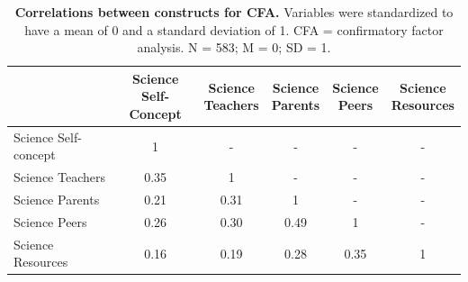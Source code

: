 \begin{table}[ht]
\begin{tabular}{lccccc}
\cline{2-6}
                  & \parbox{16mm}{\centering Science\\ Self-Concept} & \parbox{13mm}{\centering Science\\ Teachers} &  \parbox{12mm}{\centering Science\\ Parents} & \parbox{12mm}{\centering Science\\ Peers} & \parbox{12mm}{\centering Science\\ Resources} \\ \hline
Science Self-concept  & 1                & -                & -               & -             & -                 \\
Science Teachers  & 0.35            & 1                & -               & -             & -                 \\
Science Parents   & 0.21            & 0.31            & 1               & -             & -                 \\
Science Peers     & 0.26            & 0.30            & 0.49            & 1             & -                 \\
Science Resources & 0.16            & 0.19            & 0.28           & 0.35         & 1                 \\ \hline
\end{tabular}
\caption{\textbf{Correlations between constructs for CFA.}  Variables were standardized to have a mean of 0 and a standard deviation of 1. CFA = confirmatory factor analysis. N = 583; M = 0; SD = 1.}
\label{tab:Correlations}       %
\end{table}


